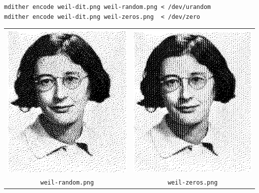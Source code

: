 \begin{verbatim}
mdither encode weil-dit.png weil-random.png < /dev/urandom
mdither encode weil-dit.png weil-zeros.png  < /dev/zero
\end{verbatim}
\begin{tabular}{cc}
	\includegraphics{weil-random.png} &
	\includegraphics{weil-zeros.png} \\
	\verb+weil-random.png+ &
	\verb+weil-zeros.png+
\end{tabular}

